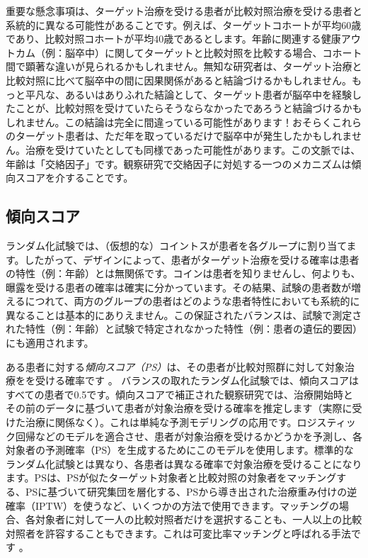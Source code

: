 \documentclass[
  11pt]{book}
\theoremstyle{definition}
\theoremstyle{definition}
\theoremstyle{definition}
\theoremstyle{definition}
\theoremstyle{remark}
\begin{document}
重要な懸念事項は、ターゲット治療を受ける患者が比較対照治療を受ける患者と系統的に異なる可能性があることです。例えば、ターゲットコホートが平均60歳であり、比較対照コホートが平均40歳であるとします。年齢に関連する健康アウトカム（例：脳卒中）に関してターゲットと比較対照を比較する場合、コホート間で顕著な違いが見られるかもしれません。無知な研究者は、ターゲット治療と比較対照に比べて脳卒中の間に因果関係があると結論づけるかもしれません。もっと平凡な、あるいはありふれた結論として、ターゲット患者が脳卒中を経験したことが、比較対照を受けていたらそうならなかったであろうと結論づけるかもしれません。この結論は完全に間違っている可能性があります！おそらくこれらのターゲット患者は、ただ年を取っているだけで脳卒中が発生したかもしれません。治療を受けていたとしても同様であった可能性があります。この文脈では、年齢は「交絡因子」です。観察研究で交絡因子に対処する一つのメカニズムは傾向スコアを介することです。 

\subsection{傾向スコア}\label{ux50beux5411ux30b9ux30b3ux30a2}


ランダム化試験では、（仮想的な）コイントスが患者を各グループに割り当てます。したがって、デザインによって、患者がターゲット治療を受ける確率は患者の特性（例：年齢）とは無関係です。コインは患者を知りませんし、何よりも、曝露を受ける患者の確率は確実に分かっています。その結果、試験の患者数が増えるにつれて、両方のグループの患者はどのような患者特性においても系統的に異なることは基本的にありえません。この保証されたバランスは、試験で測定された特性（例：年齢）と試験で特定されなかった特性（例：患者の遺伝的要因）にも適用されます。 

ある患者に対する\emph{傾向スコア（PS）}は、その患者が比較対照群に対して対象治療をを受ける確率です \citep{rosenbaum_1983}。 バランスの取れたランダム化試験では、傾向スコアはすべての患者で0.5です。傾向スコアで補正された観察研究では、治療開始時とその前のデータに基づいて患者が対象治療を受ける確率を推定します（実際に受けた治療に関係なく）。これは単純な予測モデリングの応用です。ロジスティック回帰などのモデルを適合させ、患者が対象治療を受けるかどうかを予測し、各対象者の予測確率（PS）を生成するためにこのモデルを使用します。標準的なランダム化試験とは異なり、各患者は異なる確率で対象治療を受けることになります。PSは、PSが似たターゲット対象者と比較対照の対象者をマッチングする、PSに基づいて研究集団を層化する、PSから導き出された治療重み付けの逆確率（IPTW）を使うなど、いくつかの方法で使用できます。マッチングの場合、各対象者に対して一人の比較対照者だけを選択することも、一人以上の比較対照者を許容することもできます。これは可変比率マッチングと呼ばれる手法です \citep{rassen_2012}。      
\end{document}
